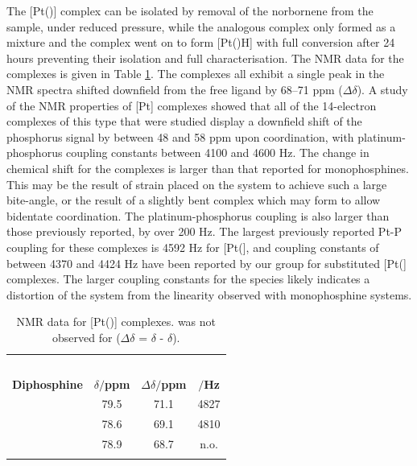 The [Pt(\tButhixantphos)] complex can be isolated by removal of the norbornene from the sample, under reduced pressure, while the analogous \tBusixantphos{} complex only formed as a mixture and the \tBuxantphos{} complex went on to form [Pt(\tBuxantphosk)H] with full conversion after 24 hours preventing their isolation and full characterisation.  The \phosphorus{} NMR data for the complexes is given in Table \ref{table:Pt14NMR}.  The complexes all exhibit a single peak in the \phosphorus{} NMR spectra shifted downfield from the free ligand by 68--71 ppm ($\Delta\delta$).  A study of the \phosphorus{} NMR properties of [Pt] complexes showed that all of the 14-electron complexes of this type that were studied display a downfield shift of the phosphorus signal by between 48 and 58 ppm upon coordination, with platinum-phosphorus coupling constants between 4100 and 4600 Hz.\cite{Mann1980}  The change in chemical shift for the \tBuxantphos{} complexes is larger than that reported for monophosphines.  This may be the result of strain placed on the system to achieve such a large bite-angle, or the result of a slightly bent complex which may form to allow bidentate coordination.  The platinum-phosphorus coupling is also larger than those previously reported, by over 200 Hz.  The largest previously reported Pt-P coupling for these complexes is 4592 Hz for [Pt(], and coupling constants of between 4370 and 4424 Hz have been reported by our group for substituted [Pt(] complexes.\cite{Kathrynthesis, Rosieunpublished}  The larger coupling constants for the \tBuxantphos{} species likely indicates a distortion of the system from the linearity observed with monophosphine systems.  

\begin{table}[htbp]
\caption[\phosphorus{} NMR data for [Pt(\tBuxantphos){]} complexes]{\phosphorus{} NMR data for [Pt(\tBuxantphos){]} complexes. \JPtP{} was not observed for \tBuxantphos{} ($\Delta\delta$ = $\delta$ - $\delta$).}
\vspace{1em}
\label{table:Pt14NMR}
\small
\begin{center}
\begin{tabular}{l c c c}
\toprule{}
	~~ & \multicolumn{3}{c}{\bfseries{\phosphorus}} \\
	\cmidrule(lr){2-4}
	\bfseries{Diphosphine}&\bfseries{$\delta/$ppm}&\bfseries{$\Delta\delta/$ppm}&\bfseries{\JPtP{}$/$Hz}\\
	\midrule
	\tBuSixantphos 		& 79.5 & 71.1 & 4827 \\
	\tBuThixantphos 	& 78.6 & 69.1 & 4810 \\
	\tBuXantphos		& 78.9 & 68.7 & n.o.\\
	\bottomrule{}
\end{tabular}
\end{center}
\end{table}


